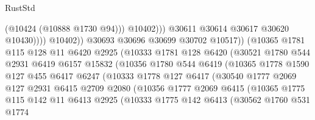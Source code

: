 \begin{lexlean}{RustStd}
\begin{coremodule}
                                          (@10424 (@10888 @1730 @94)))
                                        @10402)))
                                  @30611
                                  @30614
                                  @30617
                                  @30620
                                  @10430))))
                          @10402))
                      @30693
                      @30696
                      @30699
                      @30702
                      @10517))
                  (@10365
                    @1781
                    @115
                    @128
                    @11
                    @6420
                    @2925
                    (@10333
                      @1781
                      @128
                      @6420
                      (@30521
                        @1780
                        @544
                        @2931
                        @6419
                        @6157
                        @15832
                        (@10356
                          @1780
                          @544
                          @6419
                          (@10365
                            @1778
                            @1590
                            @127
                            @455
                            @6417
                            @6247
                            (@10333
                              @1778
                              @127
                              @6417
                              (@30540
                                @1777
                                @2069
                                @127
                                @2931
                                @6415
                                @2709
                                @2080
                                (@10356
                                  @1777
                                  @2069
                                  @6415
                                  (@10365
                                    @1775
                                    @115
                                    @142
                                    @11
                                    @6413
                                    @2925
                                    (@10333
                                      @1775
                                      @142
                                      @6413
                                      (@30562
                                        @1760
                                        @531
                                        @1774

\end{coremodule}
\end{lexlean}
